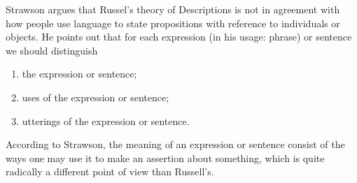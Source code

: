 \documentclass{article}
\begin{document}
\maketitle

Strawson argues that Russel's theory of Descriptions is not in agreement with
how people use language to state propositions with reference to individuals
or objects. He points out that for each expression (in his usage: phrase) or 
sentence we should distinguish
\begin{enumerate}
\item the expression or sentence;
\item uses of the expression or sentence;
\item utterings of the expression or sentence.
\end{enumerate}
According to Strawson, the meaning of an expression or sentence consist of the
ways one may use it to make an assertion about something, which is quite 
radically a different point of view than Russell's. 
\end{document}
